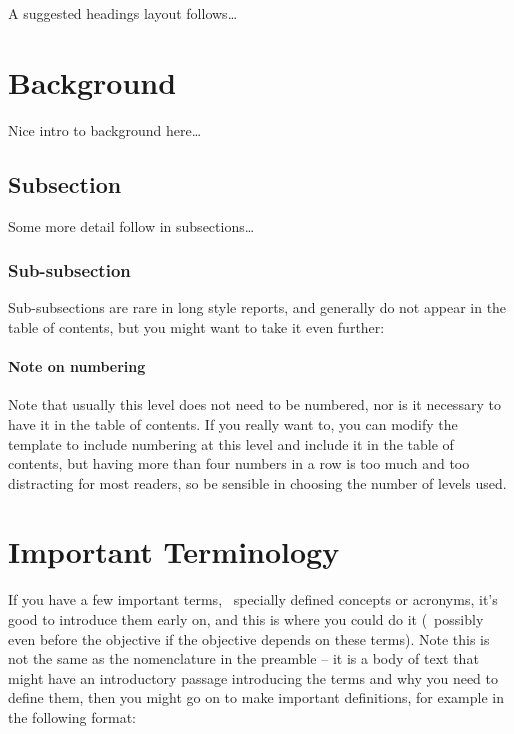 {\color{red} A suggested headings layout follows\ldots}

\section{Background}

Nice intro to background here\ldots{}

\subsection{Subsection}

Some more detail follow in subsections\ldots{}

\subsubsection{Sub-subsection}

Sub-subsections are rare in long style reports, and generally do not appear in the table of contents, but you might want to take it even further:

\paragraph{Note on numbering}

Note that usually this level does not need to be numbered, nor is it necessary to have it in the table of contents.  If you really want to, you can modify the template to include numbering at this level and include it in the table of contents, but having more than four numbers in a row is too much and too distracting for most readers, so be sensible in choosing the number of levels used.

\section{Important Terminology}

If you have a few important terms, \eg~specially defined concepts or acronyms, it's good to introduce them early on, and this is where you could do it (\ie~possibly even before the objective if the objective depends on these terms). Note this is not the same as the nomenclature in the preamble -- it is a body of text that might have an introductory passage introducing the terms and why you need to define them, then you might go on to make important definitions, for example in the following format:


